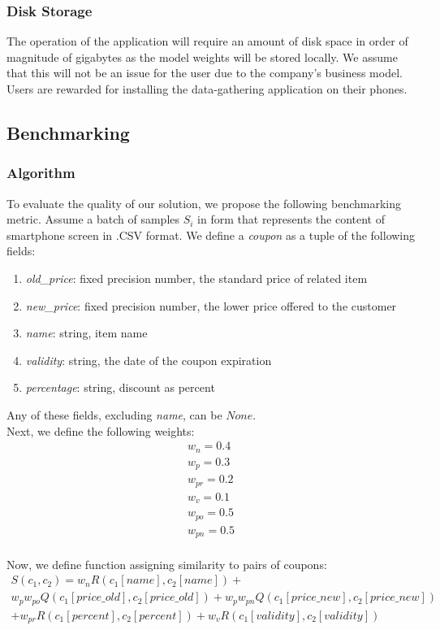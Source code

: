 \documentclass[12pt]{article}
\begin{document}
\subsubsection*{Disk Storage}
The operation of the application will require an amount of disk space in order of magnitude of gigabytes\cite{llama32-1b-size} as the model weights will be stored locally. We assume that this will not be an issue for the user due to the company's business model. Users are rewarded for installing the data-gathering application on their phones.

\subsection*{Benchmarking}
\subsubsection*{Algorithm}
To evaluate the quality of our solution, we propose the following benchmarking metric. Assume a batch of samples $S_i$ in form that represents the content of smartphone screen in .CSV format. We define a \textit{coupon} as a tuple of the following fields:
\begin{enumerate}
    \item \textit{old\_price}: fixed precision number, the standard price of related item
    \item \textit{new\_price}: fixed precision number, the lower price offered to the customer
    \item \textit{name}: string, item name
    \item \textit{validity}: string, the date of the coupon expiration
    \item \textit{percentage}: string, discount as percent
\end{enumerate}
Any of these fields, excluding \textit{name}, can be $None$.\\
Next, we define the following weights:
\begin{gather*}
    w_n=0.4 \\
    w_p=0.3 \\
    w_{pr}=0.2 \\
    w_v=0.1 \\
    w_{po}=0.5\\
    w_{pn}=0.5
\end{gather*} \\
Now, we define function assigning similarity to pairs of coupons:
\begin{gather*}
    S(c_1, c_2)=w_nR(c_1[name],c_2[name])+\\w_pw_{po}Q(c_1[price\_old],c_2[price\_old])+w_pw_{pn}Q(c_1[price\_new],c_2[price\_new])\\+w_{pr}R(c_1[percent],c_2[percent])+w_vR(c_1[validity],c_2[validity])
\end{gather*}
\end{document}
